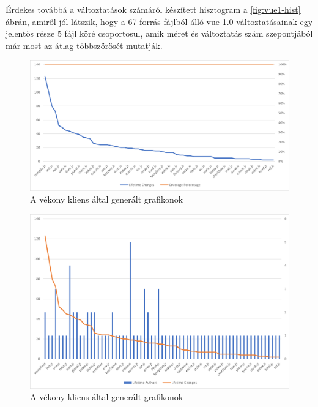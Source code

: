 Érdekes továbbá a változtatások számáról készített hisztogram a \ref{fig:vue1-hist} ábrán, amiről jól látszik, hogy a 67 forrás fájlból álló vue 1.0 változtatásainak egy jelentős része 5 fájl köré csoportosul, amik méret és változtatás szám szepontjából már most az átlag többszörösét mutatják.



\begin{figure}[H]
    \centering
    \includegraphics[width=1\textwidth]{images/vue/vue1-lifetime-changes.png}
    \caption{A vékony kliens által generált grafikonok}
    \label{fig:hestia-charts}
\end{figure}

\begin{figure}[H]
    \centering
    \includegraphics[width=1\textwidth]{images/vue/vue1-lifetimechanges-authors.png}
    \caption{A vékony kliens által generált grafikonok}
    \label{fig:hestia-charts}
\end{figure}

